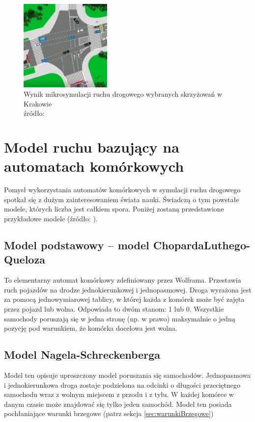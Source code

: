 \documentclass{sprawozdanie-agh}
\begin{document}
		\begin{figure}[H]
			\centering
			\captionsetup{justification=centering}
			\includegraphics[width=0.4\textwidth]{Mikrosymulacja.jpg}
			\caption{Wynik mikrosymulacji ruchu drogowego wybranych skrzyżowań w Krakowie \\ źródło: \cite{mikrosymulacja}}
			\label{fig:Mikrosymulacja}
		\end{figure}
	
		\section{Model ruchu bazujący na automatach komórkowych}
	
		Pomysł wykorzystania automatów komórkowych w symulacji ruchu drogowego spotkał się z dużym zainteresowaniem świata nauki. Świadczą o tym powstałe modele, których liczba jest całkiem spora. Poniżej zostaną przedstawione przykładowe modele (źródło: \cite{czasopisnoLogistyka}).
	
		\subsection{Model podstawowy – model ChopardaLuthego-Queloza} 
  
		To elementarny automat komórkowy zdefiniowany przez Wolframa. Przestawia ruch pojazdów na drodze jednokierunkowej i jednopasmowej. Droga wyrażona jest za pomocą jednowymiarowej tablicy, w której każda z komórek może być zajęta przez pojazd lub wolna. Odpowiada to dwóm stanom: 1 lub 0. Wszystkie samochody poruszają się w jedna stronę (np. w prawo) maksymalnie o jedną pozycję pod warunkiem, że komórka docelowa jest wolna.

		\subsection{Model Nagela-Schreckenberga}

		Model ten opisuje uproszczony model poruszania się samochodów. Jednopasmowa i jednokierunkowa droga zostaje podzielona na odcinki o długości przeciętnego samochodu wraz z wolnym miejscem z przodu i z tyłu. W każdej komórce w danym czasie może znajdować się tylko jeden samochód. Model ten posiada pochłaniające warunki brzegowe (patrz sekcja \ref{sec:warunkiBrzegowe})
\end{document}

